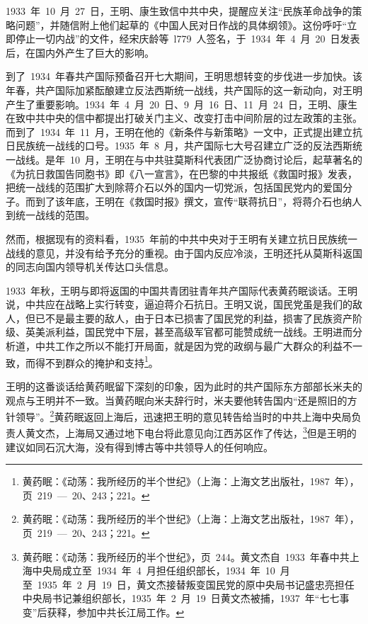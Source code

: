 1933~年~10~月~27~日，王明、康生致信中共中央，提醒应关注“民族革命战争的策略问题”，并随信附上他们起草的《中国人民对日作战的具体纲领》。这份呼吁“立即停止一切内战”的文件，经宋庆龄等~l779~人签名，于~1934~年~4~月~20~日发表后，在国内外产生了巨大的影响。

到了~1934~年春共产国际预备召开七大期间，王明思想转变的步伐进一步加快。该年春，共产国际加紧酝酿建立反法西斯统一战线，共产国际的这一新动向，对王明产生了重要影响。1934~年~4~月~20~日、9~月~16~日、11~月~24~日，王明、康生在致中共中央的信中都提出打破关门主义、改变打击中间阶层的过左政策的主张。而到了~1934~年~11~月，王明在他的《新条件与新策略》一文中，正式提出建立抗日民族统一战线的口号。1935~年~8~月，共产国际七大号召建立广泛的反法西斯统一战线。是年~10~月，王明在与中共驻莫斯科代表团广泛协商讨论后，起草著名的《为抗日救国告同胞书》即《八一宣言》，在巴黎的中共报纸《救国时报》发表，把统一战线的范围扩大到除蒋介石以外的国内一切党派，包括国民党内的爱国分子。而到了该年底，王明在《救国时报》撰文，宣传“联蒋抗日”，将蒋介石也纳人到统一战线的范围。

然而，根据现有的资料看，1935~年前的中共中央对于王明有关建立抗日民族统一战线的意见，并没有给予充分的重视。由于国内反应冷淡，王明还托从莫斯科返国的同志向国内领导机关传达口头信息。

1933~年秋，王明与即将返国的中国共青团驻青年共产国际代表黄药眠谈话。王明说，中共应在战略上实行转变，逼迫蒋介石抗日。王明又说，国民党虽是我们的敌人，但已不是最主要的敌人，由于日本已损害了国民党的利益，损害了民族资产阶级、英美派利益，国民党中下层，甚至高级军官都可能赞成统一战线。王明进而分析道，中共工作之所以不能打开局面，就是因为党的政纲与最广大群众的利益不一致，而得不到群众的掩护和支持\footnote{黄药眠：《动荡：我所经历的半个世纪》（上海：上海文艺出版社，1987~年），页~219~—~20、243；221。}。

王明的这番谈话给黄药眠留下深刻的印象，因为此时的共产国际东方部部长米夫的观点与王明并不一致。当黄药眠向米夫辞行时，米夫要他转告国内“还是照旧的方针领导”。\footnote{黄药眠：《动荡：我所经历的半个世纪》（上海：上海文艺出版社，1987~年），页~219~—~20、243；221。}黄药眠返回上海后，迅速把王明的意见转告给当时的中共上海中央局负责人黄文杰，上海局又通过地下电台将此意见向江西苏区作了传达，\footnote{黄药眠：《动荡：我所经历的半个世纪》，页~244。黄文杰自~1933~年春中共上海中央局成立至~1934~年~4~月担任组织部长，1934~年~10~月至~1935~年~2~月~19~日，黄文杰接替叛变国民党的原中央局书记盛忠亮担任中央局书记兼组织部长，1935~年~2~月~19~日黄文杰被捕，1937~年“七七事变”后获释，参加中共长江局工作。}但是王明的建议如同石沉大海，没有得到博古等中共领导人的任何响应。

